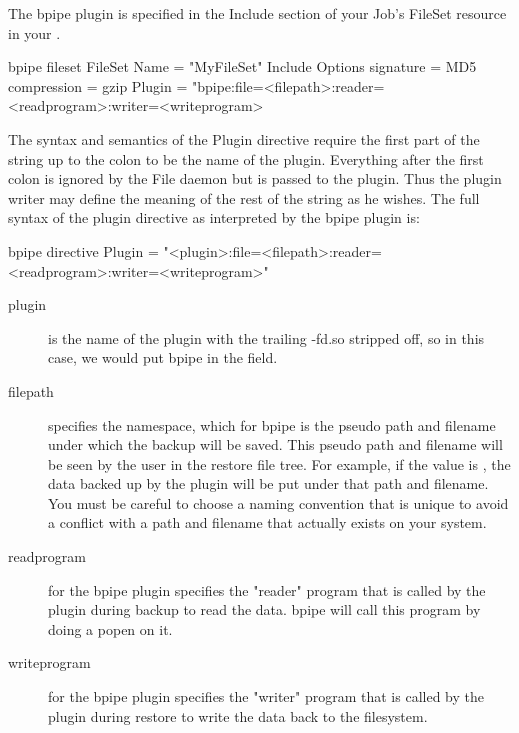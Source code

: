 The bpipe plugin is specified in the Include section of your Job's FileSet resource in your .

\begin{bconfig}{bpipe fileset}
FileSet {
  Name = "MyFileSet"
  Include {
    Options {
      signature = MD5
      compression = gzip
    }
    Plugin = "bpipe:file=<filepath>:reader=<readprogram>:writer=<writeprogram>
  }
}
\end{bconfig}

The syntax and semantics of the Plugin directive require the first part of the string up to the colon to be the name of the plugin.
Everything after the first colon is ignored by the File daemon but is passed to the plugin. Thus the plugin writer may define the 
meaning of the rest of the string as he wishes. The full syntax of the plugin directive as interpreted by the bpipe plugin is:

\begin{bconfig}{bpipe directive}
Plugin = "<plugin>:file=<filepath>:reader=<readprogram>:writer=<writeprogram>"
\end{bconfig}

\begin{description}
\item[plugin] is the name of the plugin with the trailing -fd.so stripped off, so in this case, we would put bpipe in the field.

\item[filepath] specifies the namespace, which for bpipe is the pseudo path and filename under which the backup will be saved. This
pseudo path and filename will be seen by the user in the restore file tree. For example, if the value is ,
the data
backed up by the plugin will be put under that  path and filename.
You must be careful to choose a naming convention that is unique
to avoid a conflict with a path and filename that actually exists on your system.

\item[readprogram] for the bpipe plugin specifies the "reader" program that is called by the plugin during backup to read the data. bpipe
will call this program by doing a popen on it.

\item[writeprogram] for the bpipe plugin specifies the "writer" program that is called by the plugin during restore to write the data back 
to the filesystem.
\end{description}

